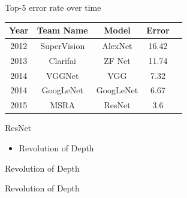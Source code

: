 \documentclass{beamer}
\begin{document}
\begin{frame}{Top-5 error rate over time}%
	\begin{center}
	\begin{table}
	\begin{tabular}{  c   c  c  c   c  } 
	 Year & Team Name & Model & Error\\ 
	\hline
	 2012 &  SuperVision  &  AlexNet &  { \color{red} 16.42  }  \\ 
	2013 & Clarifai     & ZF Net&  {\color{red} 11.74  }  \\ 
	 2014 & VGGNet         &  VGG &  {\color{red} 7.32  }  \\ 
	 2014 & GoogLeNet   &  GoogLeNet &  {\color{red}  6.67 } \\ 
	\color{red}2015 & \color{red}MSRA          & \color{red}ResNet &  {\color{red} 3.6  } \\  
	\end{tabular}
	\end{table}  
	\end{center}

	ResNet
	\begin{itemize}
	\item  Revolution of Depth
	\end{itemize} 
	\end{frame} 
	
		\begin{frame}{Revolution of Depth}%
	\begin{center}
	\end{center} 
	\end{frame}
	
	\begin{frame}{Revolution of Depth}%
	\begin{center}
	\end{center}
	\end{frame} 
\end{document}
